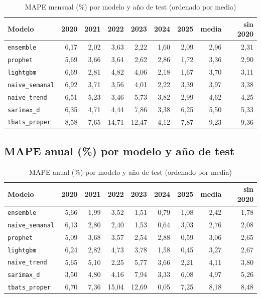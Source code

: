 \documentclass[12pt,a4paper]{article}
\begin{document}
\begin{table}[H]
\centering
\caption{MAPE mensual (\%) por modelo y año de test (ordenado por media)}
\begin{tabular}{lrrrrrrrr}
\toprule
Modelo & 2020 & 2021 & 2022 & 2023 & 2024 & 2025 & media & sin 2020 \\
\midrule
\texttt{ensemble}       & 6{,}17 & 2{,}02 &  3{,}63 &  2{,}22 & 1{,}60 & 2{,}09 & 2{,}96 & 2{,}31 \\
\texttt{prophet}        & 5{,}69 & 3{,}66 &  3{,}64 &  2{,}62 & 2{,}86 & 1{,}72 & 3{,}36 & 2{,}90 \\
\texttt{lightgbm}       & 6{,}69 & 2{,}81 &  4{,}82 &  4{,}06 & 2{,}18 & 1{,}67 & 3{,}70 & 3{,}11 \\
\texttt{naive\_semanal} & 6{,}92 & 3{,}71 &  3{,}56 &  4{,}01 & 2{,}22 & 3{,}39 & 3{,}97 & 3{,}38 \\
\texttt{naive\_trend}   & 6{,}51 & 5{,}23 &  3{,}46 &  5{,}73 & 3{,}82 & 2{,}99 & 4{,}62 & 4{,}25 \\
\texttt{sarimax\_d}     & 6{,}35 & 4{,}71 &  4{,}44 &  7{,}86 & 3{,}38 & 6{,}25 & 5{,}50 & 5{,}33 \\
\texttt{tbats\_proper}  & 8{,}58 & 7{,}65 & 14{,}71 & 12{,}47 & 4{,}12 & 7{,}87 & 9{,}23 & 9{,}36 \\
\bottomrule
\end{tabular}
\end{table}

\subsection*{MAPE anual (\%) por modelo y año de test}

\begin{table}[H]
\centering
\caption{MAPE anual (\%) por modelo y año de test (ordenado por media)}
\begin{tabular}{lrrrrrrrr}
\toprule
Modelo & 2020 & 2021 & 2022 & 2023 & 2024 & 2025 & media & sin 2020 \\
\midrule
\texttt{ensemble}       & 5{,}66 & 1{,}99 &  3{,}52 &  1{,}51 & 0{,}79 & 1{,}08 & 2{,}42 & 1{,}78 \\
\texttt{naive\_semanal} & 6{,}13 & 2{,}80 &  2{,}40 &  1{,}53 & 0{,}64 & 3{,}03 & 2{,}76 & 2{,}08 \\
\texttt{prophet}        & 5{,}09 & 3{,}68 &  3{,}57 &  2{,}54 & 2{,}88 & 0{,}59 & 3{,}06 & 2{,}65 \\
\texttt{lightgbm}       & 6{,}24 & 2{,}82 &  4{,}73 &  3{,}78 & 1{,}58 & 0{,}45 & 3{,}27 & 2{,}67 \\
\texttt{naive\_trend}   & 5{,}65 & 5{,}10 &  2{,}25 &  5{,}77 & 3{,}66 & 2{,}21 & 4{,}11 & 3{,}80 \\
\texttt{sarimax\_d}     & 3{,}50 & 4{,}80 &  4{,}16 &  7{,}94 & 3{,}33 & 6{,}08 & 4{,}97 & 5{,}26 \\
\texttt{tbats\_proper}  & 6{,}70 & 7{,}36 & 15{,}04 & 12{,}69 & 0{,}05 & 7{,}25 & 8{,}18 & 8{,}48 \\
\bottomrule
\end{tabular}
\end{table}
\end{document}
